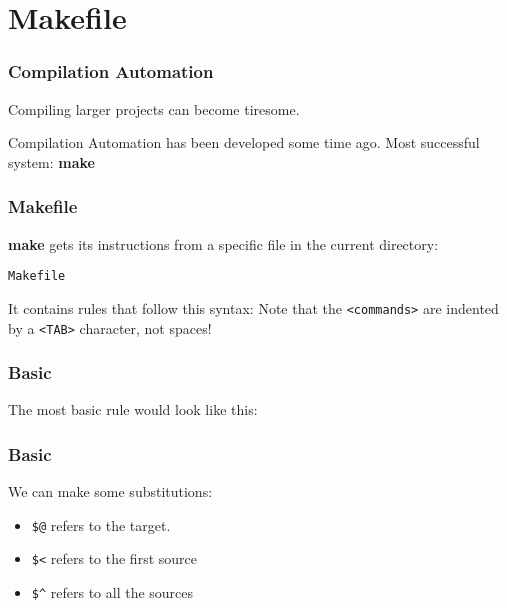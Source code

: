 \section{Makefile}
\begin{frame}
    \frametitle{Compilation Automation}
    Compiling larger projects can become tiresome.

    Compilation Automation has been developed some time ago. 
    Most successful system: \textbf{make}
\end{frame}


\begin{frame}
    \frametitle{Makefile}
    \textbf{make} gets its instructions from a specific file in the current directory:

    \texttt{Makefile}

    It contains rules that follow this syntax:
\Lst
    Note that the \texttt{<commands>} are indented by a \texttt{<TAB>} character, not spaces!
\end{frame}


\begin{frame}
    \frametitle{Basic}
    The most basic rule would look like this:
\LstBasic
\end{frame}


\begin{frame}
    \frametitle{Basic}
    We can make some substitutions:
    \begin{itemize}
        \item \texttt{\$@} refers to the target.
        \item \texttt{\$<} refers to the first source
        \item \texttt{\$\^{ }} refers to all the sources
    \end{itemize}
\LstRef
\end{frame}

